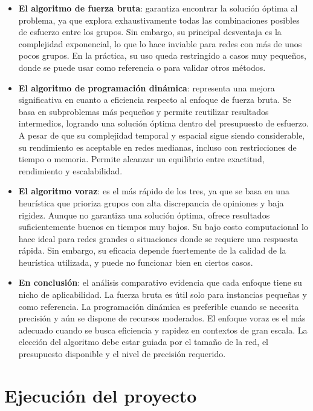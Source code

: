 \documentclass[11pt,letter]{article}
\begin{document}
\begin{itemize}
    \item \textbf{El algoritmo de fuerza bruta}: garantiza encontrar la solución óptima al problema, ya que explora exhaustivamente todas las combinaciones posibles de esfuerzo entre los grupos. Sin embargo, su principal desventaja es la complejidad exponencial, lo que lo hace inviable para redes con más de unos pocos grupos. En la práctica, su uso queda restringido a casos muy pequeños, donde se puede usar como referencia o para validar otros métodos.
    
    \item \textbf{El algoritmo de programación dinámica}: representa una mejora significativa en cuanto a eficiencia respecto al enfoque de fuerza bruta. Se basa en subproblemas más pequeños y permite reutilizar resultados intermedios, logrando una solución óptima dentro del presupuesto de esfuerzo. A pesar de que su complejidad temporal y espacial sigue siendo considerable, su rendimiento es aceptable en redes medianas, incluso con restricciones de tiempo o memoria. Permite alcanzar un equilibrio entre exactitud, rendimiento y escalabilidad.
    
    \item \textbf{El algoritmo voraz}: es el más rápido de los tres, ya que se basa en una heurística que prioriza grupos con alta discrepancia de opiniones y baja rigidez. Aunque no garantiza una solución óptima, ofrece resultados suficientemente buenos en tiempos muy bajos. Su bajo costo computacional lo hace ideal para redes grandes o situaciones donde se requiere una respuesta rápida. Sin embargo, su eficacia depende fuertemente de la calidad de la heurística utilizada, y puede no funcionar bien en ciertos casos.
    
    \item \textbf{En conclusión}: el análisis comparativo evidencia que cada enfoque tiene su nicho de aplicabilidad. La fuerza bruta es útil solo para instancias pequeñas y como referencia. La programación dinámica es preferible cuando se necesita precisión y aún se dispone de recursos moderados. El enfoque voraz es el más adecuado cuando se busca eficiencia y rapidez en contextos de gran escala. La elección del algoritmo debe estar guiada por el tamaño de la red, el presupuesto disponible y el nivel de precisión requerido.
\end{itemize}


\newpage

\section{Ejecución del proyecto}
\end{document}
